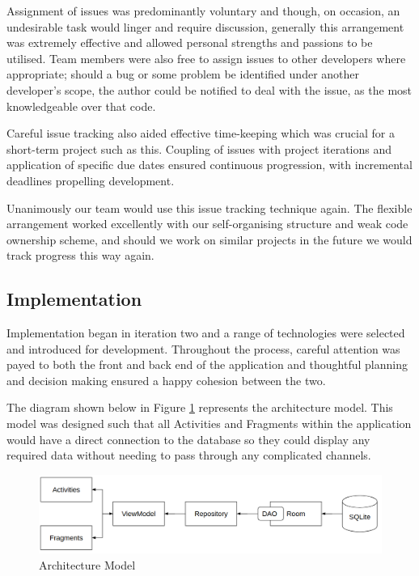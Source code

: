 \documentclass{l3proj}
\begin{document}
Assignment of issues was predominantly voluntary and though, on occasion, an undesirable task would linger and require discussion, generally this arrangement was extremely effective and allowed personal strengths and passions to be utilised. Team members were also free to assign issues to other developers where appropriate; should a bug or some problem be identified under another developer’s scope, the author could be notified to deal with the issue, as the most knowledgeable over that code. 

Careful issue tracking also aided effective time-keeping which was crucial for a short-term project such as this. Coupling of issues with project iterations and application of specific due dates ensured continuous progression, with incremental deadlines propelling development.

Unanimously our team would use this issue tracking technique again. The flexible arrangement worked excellently with our self-organising structure and weak code ownership scheme, and should we work on similar projects in the future we would track progress this way again.


\subsection{Implementation} \label{sec:3.3}
Implementation began in iteration two and a range of technologies were selected and introduced for development. Throughout the process, careful attention was payed to both the front and back end of the application and thoughtful planning and decision making ensured a happy cohesion between the two. 

The diagram shown below in Figure \ref{fig:architecture} represents the architecture model. This model was designed such that all Activities and Fragments within the application would have a direct connection to the database so they could display any required data without needing to pass through any complicated channels.

\begin{figure}[ht]
  \includegraphics[width=\linewidth]{figures/architecture.png}
  \caption{Architecture Model}
  \label{fig:architecture}
\end{figure}
\end{document}
